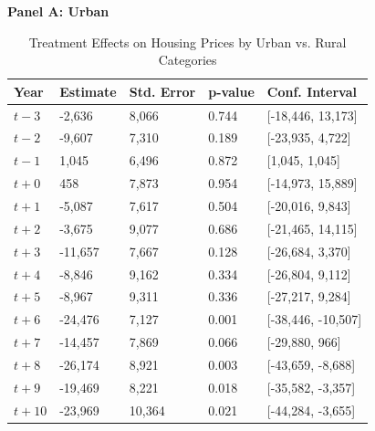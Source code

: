 \begin{table}[htbp]
    \centering
    \caption{Treatment Effects on Housing Prices by Urban vs. Rural Categories}
    \label{tab:urban_rural_results}
    \begin{threeparttable}
    \small
    \textbf{Panel A: Urban} \\[4pt]
    \begin{tabularx}{\textwidth}{l*{4}{X}}
    \hline\hline
    \textbf{Year} & \textbf{Estimate} & \textbf{Std. Error} & \textbf{p-value} & \textbf{Conf. Interval} \\
    \hline
    $t - 3$  & -2,636  & 8,066  & 0.744 & [-18,446, 13,173] \\
    $t - 2$  & -9,607  & 7,310  & 0.189 & [-23,935, 4,722] \\
    $t - 1$  & 1,045   & 6,496  & 0.872 & [1,045, 1,045] \\
    $t + 0$  & 458     & 7,873  & 0.954 & [-14,973, 15,889] \\
    $t + 1$  & -5,087  & 7,617  & 0.504 & [-20,016, 9,843] \\
    $t + 2$  & -3,675  & 9,077  & 0.686 & [-21,465, 14,115] \\
    $t + 3$  & -11,657 & 7,667  & 0.128 & [-26,684, 3,370] \\
    $t + 4$  & -8,846  & 9,162  & 0.334 & [-26,804, 9,112] \\
    $t + 5$  & -8,967  & 9,311  & 0.336 & [-27,217, 9,284] \\
    $t + 6$  & -24,476 & 7,127  & 0.001 & [-38,446, -10,507] \\
    $t + 7$  & -14,457 & 7,869  & 0.066 & [-29,880, 966] \\
    $t + 8$  & -26,174 & 8,921  & 0.003 & [-43,659, -8,688] \\
    $t + 9$  & -19,469 & 8,221  & 0.018 & [-35,582, -3,357] \\
    $t + 10$ & -23,969 & 10,364 & 0.021 & [-44,284, -3,655] \\
    \hline
    \end{tabularx}
    
    \vspace{8pt}
    

\end{threeparttable}
\end{table}
